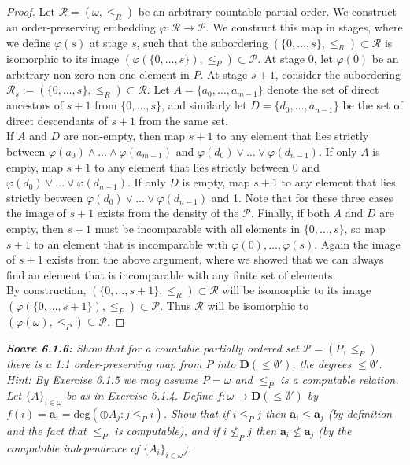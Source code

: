 \documentclass{article}
\begin{document}
\begin{proof}
    Let $\mathcal{R}=(\omega,\leq_R)$ be an arbitrary countable partial
    order. We construct an order-preserving embedding
    $\varphi:\mathcal{R}\rightarrow\mathcal{P}$. We construct this map in
    stages, where we define $\varphi(s)$ at stage $s$, such that the
    subordering $(\{0,\ldots,s\},\leq_R)\subset\mathcal{R}$ is isomorphic
    to its image $(\varphi(\{0,\ldots,s\}),\leq_P)\subset\mathcal{P}$. At
    stage 0, let $\varphi(0)$ be an arbitrary non-zero non-one element in
    $P$. At stage $s+1$, consider the subordering $\mathcal{R}_{s}
    :=(\{0,\ldots,s\},\leq_R)\subset\mathcal{R}$. Let
    $A=\{a_0,\ldots,a_{m-1}\}$ denote the set of direct ancestors of $s+1$
    from $\{0,\ldots,s\}$, and similarly let $D=\{d_0,\ldots,a_{n-1}\}$ be
    the set of direct descendants of $s+1$ from the same set. \\

    If $A$ and $D$ are non-empty, then map $s+1$ to any element that lies
    strictly between $\varphi(a_0)\wedge\ldots\wedge\varphi(a_{m-1})$ and
    $\varphi(d_0)\vee\ldots\vee\varphi(d_{n-1})$. If only $A$ is empty, map
    $s+1$ to any element that lies strictly between 0 and
    $\varphi(d_0)\vee\ldots\vee\varphi(d_{n-1})$. If only $D$ is empty, map
    $s+1$ to any element that lies strictly between
    $\varphi(d_0)\vee\ldots\vee\varphi(d_{n-1})$ and 1. Note that for these
    three cases the image of $s+1$ exists from the density of the
    $\mathcal{P}$. Finally, if both $A$ and $D$ are empty, then $s+1$ must
    be incomparable with all elements in $\{0,\ldots,s\}$, so map $s+1$ to
    an element that is incomparable with $\varphi(0),\ldots,\varphi(s)$.
    Again the image of $s+1$ exists from the above argument, where we
    showed that we can always find an element that is incomparable with any
    finite set of elements. \\

    By construction, $(\{0,\ldots,s+1\},\leq_R)\subset\mathcal{R}$ will be
    isomorphic to its image
    $(\varphi(\{0,\ldots,s+1\}),\leq_P)\subset\mathcal{P}$. Thus
    $\mathcal{R}$ will be isomorphic to
    $(\varphi(\omega),\leq_P)\subseteq\mathcal{P}$.
  \end{proof}

\it \textbf{Soare 6.1.6:} Show that for a countable partially ordered set
  $\mathcal{P}=(P,\leq_P)$ there is a 1:1 order-preserving map from $P$
  into $\bm{D}(\leq\emptyset')$, the degrees $\leq\emptyset'$. Hint:
  By Exercise 6.1.5 we may assume $P=\omega$ and $\leq_P$ is a computable
  relation. Let $\{A\}_{i\in\omega}$ be as in Exercise 6.1.4. Define
  $f:\omega\rightarrow \bm{D}(\leq\emptyset')$ by
  $f(i)=\bm{a}_i=\text{deg}(\oplus A_j:j\leq_P i)$. Show that if $i\leq_P
  j$ then $\bm{a}_i\leq\bm{a}_j$ (by definition and the fact that $\leq_P$
  is computable), and if $i\not\leq_P j$ then $\bm{a}_i\not\leq\bm{a}_j$
  (by the computable independence of $\{A_i\}_{i\in\omega}$).
\end{document}
